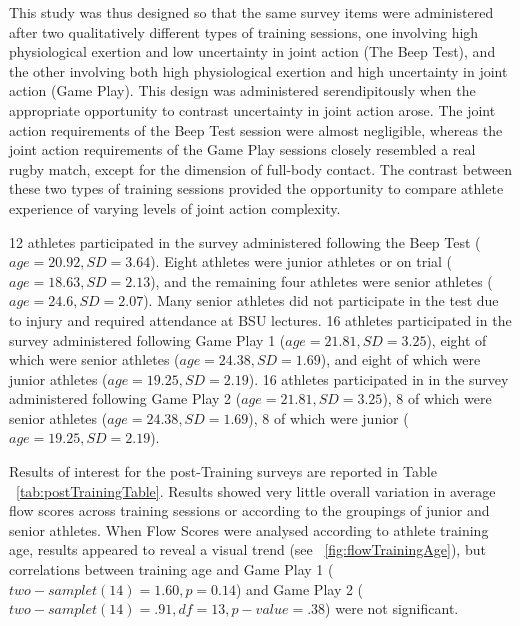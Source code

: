 \begin{CJK}{UTF8}{gbsn}
This study was thus designed so that the same survey items were administered after two qualitatively different types of training sessions, one involving high physiological exertion and low uncertainty in joint action (The Beep Test), and the other involving both high physiological exertion and high uncertainty in joint action (Game Play).  This design was administered serendipitously when the appropriate opportunity to contrast uncertainty in joint action arose.  The joint action requirements of the Beep Test session were almost negligible, whereas the joint action requirements of the Game Play sessions closely resembled a real rugby match, except for the dimension of full-body contact.  The contrast between these two types of training sessions provided the opportunity to compare athlete experience of varying levels of joint action complexity.

12 athletes participated in the survey administered following the Beep Test ($age = 20.92, SD = 3.64$). Eight athletes were junior athletes or on trial ($age = 18.63, SD = 2.13$), and the remaining four athletes were senior athletes ($age = 24.6, SD = 2.07$).  Many senior athletes did not participate in the test due to injury and required attendance at BSU lectures.  16 athletes participated in the survey administered following Game Play 1 ($age = 21.81, SD = 3.25$), eight of which were senior athletes ($age = 24.38, SD =1.69$), and eight of which were junior athletes ($age = 19.25, SD = 2.19$).  16 athletes participated in in the survey administered following Game Play 2 ($age = 21.81, SD = 3.25$), 8 of which were senior athletes ($age = 24.38, SD =1.69$), 8 of which were junior ($age = 19.25, SD = 2.19$).



Results of interest for the post-Training surveys are reported in Table ~\ref{tab:postTrainingTable}.  Results showed very little overall variation in average flow scores across training sessions or according to the groupings of junior and senior athletes.  When Flow Scores were analysed according to athlete training age, results appeared to reveal a visual trend (see ~\ref{fig:flowTrainingAge}), but correlations between training age and Game Play 1 ($two-sample t(14) = 1.60, p = 0.14$)  and Game Play 2  ($two-sample t(14) = .91, df = 13, p-value = .38$) were not significant.


\end{CJK}
